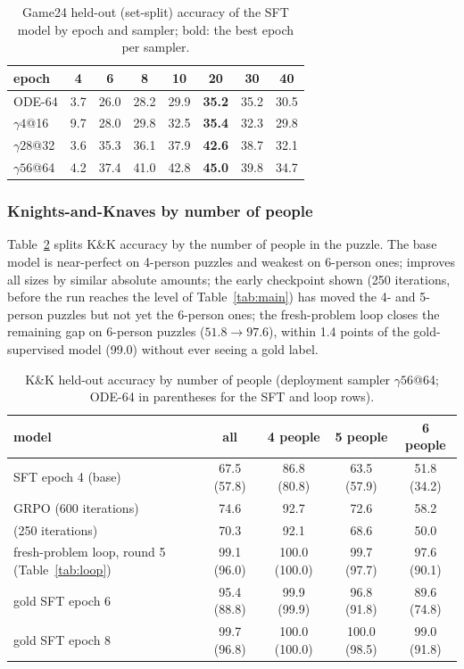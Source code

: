 \begin{table}[H]\centering\small
\caption{Game24 held-out (set-split) accuracy of the SFT model by epoch and sampler; bold: the best epoch per sampler.}\label{tab:g24_sft}
\begin{tabular}{@{}lccccccc@{}}\toprule
epoch & 4 & 6 & 8 & 10 & \textbf{20} & 30 & 40\\\midrule
ODE-64 & 3.7 & 26.0 & 28.2 & 29.9 & \textbf{35.2} & 35.2 & 30.5\\
$\gamma4$@16 & 9.7 & 28.0 & 29.8 & 32.5 & \textbf{35.4} & 32.3 & 29.8\\
$\gamma28$@32 & 3.6 & 35.3 & 36.1 & 37.9 & \textbf{42.6} & 38.7 & 32.1\\
$\gamma56$@64 & 4.2 & 37.4 & 41.0 & 42.8 & \textbf{45.0} & 39.8 & 34.7\\\bottomrule\end{tabular}\end{table}

\fi


\iffalse
\subsubsection{Knights-and-Knaves by number of people}
\label{app:kk_by_n}
Table~\ref{tab:kk_by_n} splits K\&K accuracy by the number of people in the puzzle. The base model is near-perfect on 4-person puzzles and weakest on 6-person ones; \methodGRPO{} improves all sizes by similar absolute amounts; the early \methodSVGTwoD{} checkpoint shown (250 iterations, before the run reaches the level of Table~\ref{tab:main}) has moved the 4- and 5-person puzzles but not yet the 6-person ones; the fresh-problem loop closes the remaining gap on 6-person puzzles ($51.8\to97.6$), within 1.4 points of the gold-supervised model (99.0) without ever seeing a gold label.

\begin{table}[H]\centering\small
\caption{K\&K held-out accuracy by number of people (deployment sampler $\gamma56$@64; ODE-64 in parentheses for the SFT and loop rows).}\label{tab:kk_by_n}
\begin{tabular}{@{}lcccc@{}}\toprule
model & all & 4 people & 5 people & 6 people\\\midrule
SFT epoch 4 (base) & 67.5 (57.8) & 86.8 (80.8) & 63.5 (57.9) & 51.8 (34.2)\\
GRPO (600 iterations) & 74.6 & 92.7 & 72.6 & 58.2\\
\methodSVGTwoD{} (250 iterations) & 70.3 & 92.1 & 68.6 & 50.0\\
fresh-problem loop, round 5 (Table~\ref{tab:loop}) & 99.1 (96.0) & 100.0 (100.0) & 99.7 (97.7) & 97.6 (90.1)\\
gold SFT epoch 6 & 95.4 (88.8) & 99.9 (99.9) & 96.8 (91.8) & 89.6 (74.8)\\
gold SFT epoch 8 & 99.7 (96.8) & 100.0 (100.0) & 100.0 (98.5) & 99.0 (91.8)\\\bottomrule\end{tabular}\end{table}

